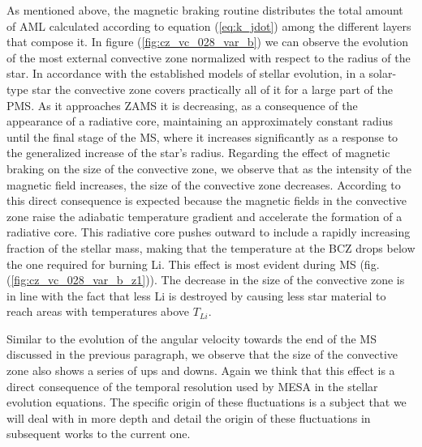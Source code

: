 \documentclass[fleqn,usenatbib]{mnras}
\begin{document}
As mentioned above, the magnetic braking routine distributes the total amount of AML calculated according to equation (\ref{eq:k_jdot}) among the different layers that compose it. In figure (\ref{fig:cz_vc_028_var_b}) we can observe the evolution of the most external convective zone normalized with respect to the radius of the star. In accordance with the established models of stellar evolution, in a solar-type star the convective zone covers practically all of it for a large part of the PMS. As it approaches ZAMS it is decreasing, as a consequence of the appearance of a radiative core, maintaining an approximately constant radius until the final stage of the MS, where it increases significantly as a response to the generalized increase of the star's radius. Regarding the effect of magnetic braking on the size of the convective zone, we observe that as the intensity of the magnetic field increases, the size of the convective zone decreases. According to \citet{Jeffries2004} this direct consequence is expected because the magnetic fields in the convective zone raise the adiabatic temperature gradient and accelerate the formation of a radiative core. This radiative core pushes outward to include a rapidly increasing fraction of the stellar mass, making that the temperature at the BCZ drops below the one required for burning Li. This effect is most evident during MS (fig. (\ref{fig:cz_vc_028_var_b_z1})). The decrease in the size of the convective zone is in line with the fact that less Li is destroyed by causing less star material to reach areas with temperatures above $T_{Li}$. \par

Similar to the evolution of the angular velocity towards the end of the MS discussed in the previous paragraph, we observe that the size of the convective zone also shows a series of ups and downs. Again we think that this effect is a direct consequence of the temporal resolution used by MESA in the stellar evolution equations. The specific origin of these fluctuations is a subject that we will deal with in more depth and detail the origin of these fluctuations in subsequent works to the current one.\par
\end{document}
